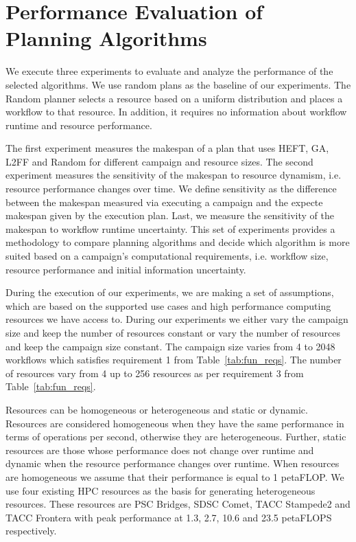 \section{Performance Evaluation of Planning Algorithms}
\label{sec:algo_perf_comp}

We execute three experiments to evaluate and analyze the performance of the selected algorithms.
We use random plans as the baseline of  our experiments.
The Random planner selects a resource based on a uniform distribution and places a workflow to that resource.
In addition, it requires no information about workflow runtime and resource performance.

The first experiment measures the makespan of a plan that uses HEFT, GA, L2FF and Random for different campaign and resource sizes.
The second experiment measures the sensitivity of the makespan to resource dynamism, i.e. resource performance changes over time.
We define sensitivity as the difference between the makespan measured via executing a campaign and the expecte makespan given by the execution plan.
Last, we measure the sensitivity of the makespan to workflow runtime uncertainty.
This set of experiments provides a methodology to compare planning algorithms and decide which algorithm is more suited based on a campaign's computational requirements, i.e. workflow size, resource performance and initial information uncertainty.

During the execution of our experiments, we are making a set of assumptions, which are based on the supported use cases and high performance computing resources we have access to.
During our experiments we either vary the campaign size and keep the number of resources constant or vary the number of resources and keep the campaign size constant.
The campaign size varies from 4 to 2048 workflows which satisfies requirement 1 from Table~\ref{tab:fun_reqs}.
The number of resources vary from 4 up to 256 resources as per requirement 3 from Table~\ref{tab:fun_reqs}.

Resources can be homogeneous or heterogeneous and static or dynamic.
Resources are considered homogeneous when they have the same performance in terms of operations per second, otherwise they are heterogeneous.
Further, static resources are those whose performance does not change over runtime and dynamic when the resource performance changes over runtime.
When resources are homogeneous we assume that their performance is equal to 1 petaFLOP.
We use four existing HPC resources as the basis for generating heterogeneous resources.
These resources are PSC Bridges, SDSC Comet, TACC Stampede2 and TACC Frontera with peak performance at 1.3, 2.7, 10.6 and 23.5 petaFLOPS respectively.

